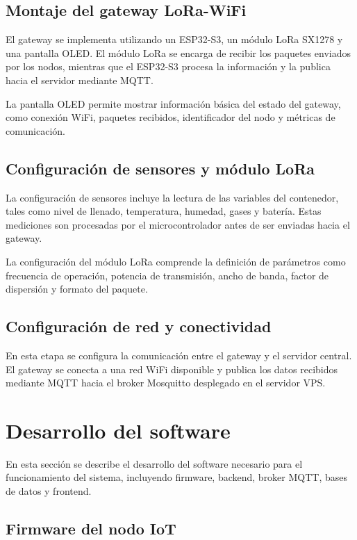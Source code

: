 \subsection{Montaje del gateway LoRa-WiFi}

El gateway se implementa utilizando un ESP32-S3, un módulo LoRa SX1278 y una pantalla OLED. El módulo LoRa se encarga de recibir los paquetes enviados por los nodos, mientras que el ESP32-S3 procesa la información y la publica hacia el servidor mediante MQTT.

La pantalla OLED permite mostrar información básica del estado del gateway, como conexión WiFi, paquetes recibidos, identificador del nodo y métricas de comunicación.

\subsection{Configuración de sensores y módulo LoRa}

La configuración de sensores incluye la lectura de las variables del contenedor, tales como nivel de llenado, temperatura, humedad, gases y batería. Estas mediciones son procesadas por el microcontrolador antes de ser enviadas hacia el gateway.

La configuración del módulo LoRa comprende la definición de parámetros como frecuencia de operación, potencia de transmisión, ancho de banda, factor de dispersión y formato del paquete.

\subsection{Configuración de red y conectividad}

En esta etapa se configura la comunicación entre el gateway y el servidor central. El gateway se conecta a una red WiFi disponible y publica los datos recibidos mediante MQTT hacia el broker Mosquitto desplegado en el servidor VPS.

\section{Desarrollo del software}

En esta sección se describe el desarrollo del software necesario para el funcionamiento del sistema, incluyendo firmware, backend, broker MQTT, bases de datos y frontend.

\subsection{Firmware del nodo IoT}


